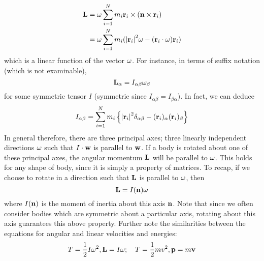 \documentclass{article}
\begin{document}
\begin{align*}
	\vb L & = \omega \sum_{i=1}^N m_i \vb r_i \times (\vb n \times \vb r_i)                            \\
	      & = \omega \sum_{i=1}^N m_i (\abs{\vb r_i}^2 \vb\omega - (\vb r_i \cdot \vb \omega) \vb r_i)
\end{align*}
which is a linear function of the vector $\vb\omega$. For instance, in terms of suffix notation (which is not examinable),
\[ \vb L_\alpha = I_{\alpha\beta} \omega_\beta \]
for some symmetric tensor $I$ (symmetric since $I_{\alpha\beta} = I_{\beta\alpha}$). In fact, we can deduce
\[ I_{\alpha\beta} = \sum_{i=1}^N m_i \left\{ \abs{\vb r_i}^2 \delta_{\alpha\beta} - (\vb r_i)_\alpha (\vb r_i)_\beta \right\} \]
In general therefore, there are three principal axes; three linearly independent directions $\vb \omega$ such that $I \cdot \vb w$ is parallel to $\vb w$. If a body is rotated about one of these principal axes, the angular momentum $\vb L$ will be parallel to $\vb\omega$. This holds for any shape of body, since it is simply a property of matrices. To recap, if we choose to rotate in a direction such that $\vb L$ is parallel to $\vb \omega$, then
\[ \vb L = I(\vb n) \vb \omega \]
where $I(\vb n)$ is the moment of inertia about this axis $\vb n$. Note that since we often consider bodies which are symmetric about a particular axis, rotating about this axis guarantees this above property. Further note the similarities between the equations for angular and linear velocities and energies:
\[ T = \frac{1}{2}I\omega^2, \vb L = I\vb\omega;\quad T = \frac{1}{2}mv^2, \vb p = m\vb v \]
\end{document}
